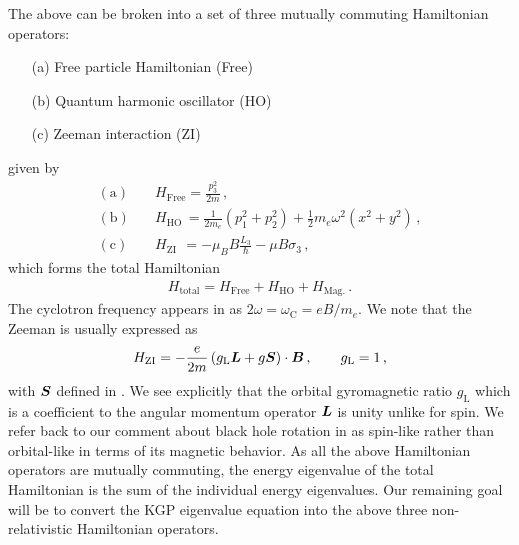 The above can be broken into a set of three mutually commuting Hamiltonian operators:
\begin{itemize}[nosep]
    \item[(a)] Free particle Hamiltonian (Free)
    \item[(b)] Quantum harmonic oscillator (HO)
    \item[(c)] Zeeman interaction (ZI)
\end{itemize}
given by
\begin{align}
	\label{homogeneous:7a}
    \mathrm{(a)}\quad&H_{\mathrm{Free}}=\frac{p_{3}^{2}}{2m}\,,\\
	\label{homogeneous:7b}
    \mathrm{(b)}\quad&H_\mathrm{HO}\,=\frac{1}{2m_{e}}\left(p_{1}^{2}+p_{2}^{2}\right) + \frac{1}{2}m_{e}\omega^{2}(x^{2}+y^{2})\,,\\
	\label{homogeneous:7c}
    \mathrm{(c)}\quad&H_{\mathrm{ZI}}\ \,=-\mu_{B}B\frac{L_{3}}{\hbar}-\mu B\sigma_{3}\,,
\end{align}
which forms the total Hamiltonian
\begin{align}
    \label{homogeneous:7}
    H_\mathrm{total} = H_\mathrm{Free} + H_\mathrm{HO} + H_\mathrm{Mag.}\,.
\end{align}
The cyclotron frequency appears in  as $2\omega=\omega_\mathrm{C}=eB/m_{e}$. We note that the Zeeman  is usually expressed as
\begin{alignat}{1}
	\label{homogeneous:7d}
    H_{\mathrm{ZI}}=-\frac{e}{2m}\left(g_\mathrm{L}\boldsymbol{L}+g\boldsymbol{S}\right)\cdot\boldsymbol{B}\,,\qquad g_\mathrm{L}=1\,,
\end{alignat}
with $\boldsymbol{S}$ defined in . We see explicitly that the orbital gyromagnetic ratio $g_\mathrm{L}$ which is a coefficient to the angular momentum operator $\boldsymbol{L}$ is unity unlike for spin. We refer back to our comment about black hole rotation in  as spin-like rather than orbital-like in terms of its magnetic behavior. As all the above Hamiltonian operators are mutually commuting, the energy eigenvalue of the total Hamiltonian is the sum of the individual energy eigenvalues. Our remaining goal will be to convert the KGP eigenvalue equation into the above three non-relativistic Hamiltonian operators. 

